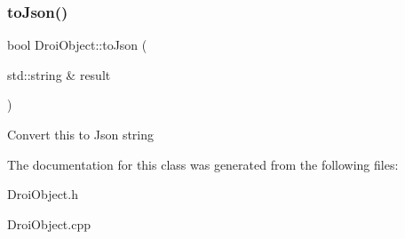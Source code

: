 \subsubsection{\texorpdfstring{to\+Json()}{toJson()}}
{\footnotesize\ttfamily bool Droi\+Object\+::to\+Json (\begin{DoxyParamCaption}\item[{std\+::string \&}]{result }\end{DoxyParamCaption})}

Convert this to Json string 

The documentation for this class was generated from the following files\+:\begin{DoxyCompactItemize}
\item 
Droi\+Object.\+h\item 
Droi\+Object.\+cpp\end{DoxyCompactItemize}
